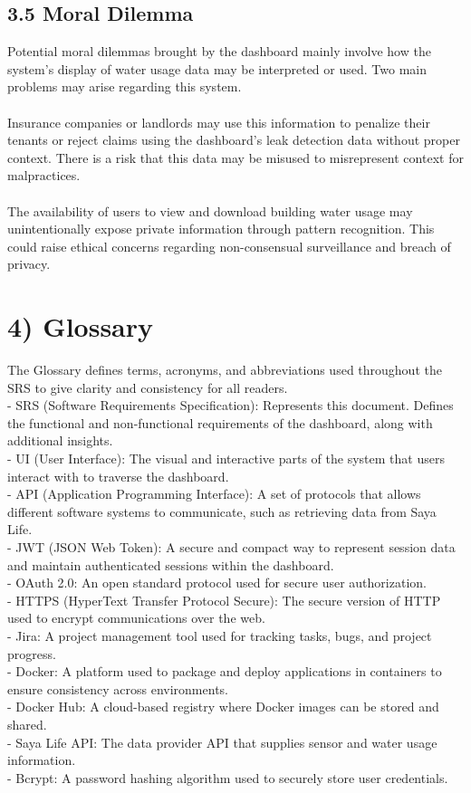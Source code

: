 \documentclass[10pt]{article}
\begin{document}
\subsection*{3.5 Moral Dilemma}
Potential moral dilemmas brought by the dashboard mainly involve how the system's display of water usage data may be interpreted or used. Two main problems may arise regarding this system.\\\\
Insurance companies or landlords may use this information to penalize their tenants or reject claims using the dashboard's leak detection data without proper context. There is a risk that this data may be misused to misrepresent context for malpractices.\\\\
The availability of users to view and download building water usage may unintentionally expose private information through pattern recognition. This could raise ethical concerns regarding non-consensual surveillance and breach of privacy.
\newpage
\section*{4) Glossary}
The Glossary defines terms, acronyms, and abbreviations used throughout the SRS to give clarity and consistency for all readers.\\
- SRS (Software Requirements Specification): Represents this document. Defines the functional and non-functional requirements of the dashboard, along with additional insights.\\
- UI (User Interface): The visual and interactive parts of the system that users interact with to traverse the dashboard.\\
- API (Application Programming Interface): A set of protocols that allows different software systems to communicate, such as retrieving data from Saya Life.\\
- JWT (JSON Web Token): A secure and compact way to represent session data and maintain authenticated sessions within the dashboard.\\
- OAuth 2.0: An open standard protocol used for secure user authorization.\\
- HTTPS	(HyperText Transfer Protocol Secure): The secure version of HTTP used to encrypt communications over the web.\\
- Jira: A project management tool used for tracking tasks, bugs, and project progress.\\
- Docker: A platform used to package and deploy applications in containers to ensure consistency across environments.\\
- Docker Hub: A cloud-based registry where Docker images can be stored and shared.\\
- Saya Life API: The data provider API that supplies sensor and water usage information.\\
- Bcrypt: A password hashing algorithm used to securely store user credentials.
\end{document}
